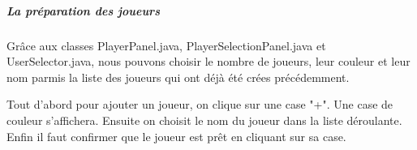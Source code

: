 \subparagraph*{La préparation des joueurs}

Grâce aux classes PlayerPanel.java, PlayerSelectionPanel.java et UserSelector.java, nous pouvons choisir le nombre de joueurs, leur couleur et leur nom parmis la liste des joueurs qui ont déjà été crées précédemment.

Tout d'abord pour ajouter un joueur, on clique sur une case "+". Une case de couleur s'affichera. Ensuite on choisit le nom du joueur dans la liste déroulante. Enfin il faut confirmer que le joueur est prêt en cliquant sur sa case.

\begin{figure}[h!]
    \centering
    \qquad
    \qquad

\end{figure}
